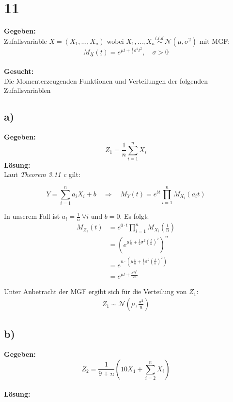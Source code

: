 \documentclass{article}
\begin{document}
\section*{11}
\textbf{Gegeben:} \\

Zufallsvariable $\underline{X} = (X_1, \ldots, X_n)$ wobei $X_1, \ldots, X_n \overset{i.i.d.}{\sim} \mathcal{N}(\mu, \sigma^2)$ mit MGF: \[M_{\underline{X}}(\underline{t}) = e^{\mu t + \frac{1}{2}\sigma^2t^2}, \quad \sigma > 0\] \\ 
\textbf{Gesucht:} \\

Die Momenterzeugenden Funktionen und Verteilungen der folgenden Zufallsvariablen
\subsection*{a)}
\textbf{Gegeben:}
\[Z_1 = \frac{1}{n}\sum_{i = 1}^{n}X_i\]
\textbf{Lösung:}\\

Laut \textit{Theorem 3.11 c} gilt:

\[Y = \sum_{i=1}^{n}a_iX_i + b \quad  \Rightarrow \quad M_Y(t) = e^{bt} \prod_{i=1}^{n}M_{X_i}(a_i t)\]

In unserem Fall ist $a_i = \frac{1}{n} ~\forall i $ und $b = 0 $. Es folgt:
\begin{align*}
    M_{Z_1}(t) &= e^{0 \cdot t} \prod_{i = 1}^{n} M_{X_i}(\frac{t}{n}) \\
    &=  (e^{\mu \frac{t}{n} + \frac{1}{2}\sigma^2(\frac{t}{n})^2})^n \\
    &= e^{n\cdot(\mu \frac{t}{n} + \frac{1}{2}\sigma^2(\frac{t}{n})^2)} \\
    &= e^{\mu t+ \frac{\sigma^2 t^2}{2n}} 
\end{align*}

Unter Anbetracht der MGF ergibt sich für die Verteilung von $Z_1$:
\begin{align*}
    Z_1 \sim \mathcal{N}(\mu, \frac{\sigma^2}{n})
\end{align*}
\subsection*{b)}
\textbf{Gegeben:} \\

\[Z_2 = \frac{1}{9+n}(10X_1 +\sum_{i=2}^{n}X_i)\]\\
\textbf{Lösung:} \\
\end{document}

